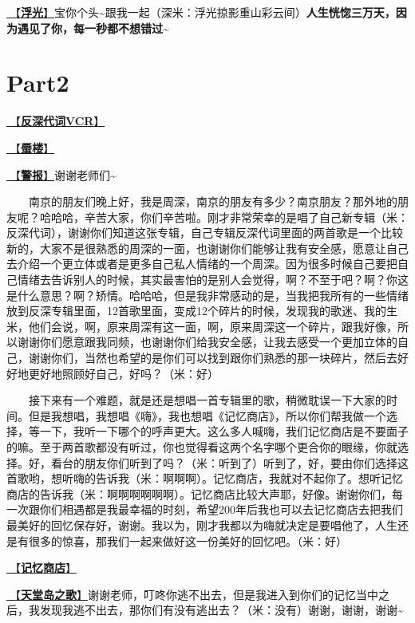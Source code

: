 \documentclass[]{ctexbook}
\begin{document}
\hyperref[floating-light]{🎵【\textbf{浮光}】}宝你个头\textasciitilde 跟我一起（深米：浮光掠影重山彩云间）\textbf{人生恍惚三万天，因为遇见了你，每一秒都不想错过\textasciitilde{}}

\section{Part2}\label{nanjing-20240811-part2}

\hyperref[senself-vcr]{🎥【\textbf{反深代词VCR}】}

\hyperref[mirage]{🎵【\textbf{蜃楼}】}

\hyperref[the-giver]{🎵【\textbf{警报}】}谢谢老师们\textasciitilde{}

  南京的朋友们晚上好，我是周深，南京的朋友有多少？南京朋友？那外地的朋友呢？哈哈哈，辛苦大家，你们辛苦啦。刚才非常荣幸的是唱了自己新专辑（米：反深代词），谢谢你们知道这张专辑，自己专辑反深代词里面的两首歌是一个比较新的，大家不是很熟悉的周深的一面，也谢谢你们能够让我有安全感，愿意让自己去介绍一个更立体或者是更多自己私人情绪的一个周深。因为很多时候自己要把自己情绪去告诉别人的时候，其实最害怕的是别人会觉得，啊？不至于吧？啊？你这是什么意思？啊？矫情。哈哈哈，但是我非常感动的是，当我把我所有的一些情绪放到反深专辑里面，12首歌里面，变成12个碎片的时候，发现我的歌迷、我的生米，他们会说，啊，原来周深有这一面，啊，原来周深这一个碎片，跟我好像，所以谢谢你们愿意跟我同频，也谢谢你们给我安全感，让我去感受一个更加立体的自己，谢谢你们，当然也希望的是你们可以找到跟你们熟悉的那一块碎片，然后去好好地更好地照顾好自己，好吗？（米：好）

  接下来有一个难题，就是还是想唱一首专辑里的歌，稍微耽误一下大家的时间。但是我想唱，我想唱《嗨》，我也想唱《记忆商店》，所以你们帮我做一个选择，等一下，我听一下哪个的呼声更大。这么多人喊嗨，我们记忆商店是不要面子的嘛。至于两首歌都没有听过，你也觉得看这两个名字哪个更合你的眼缘，你就选择。好，看台的朋友你们听到了吗？（米：听到了）听到了，好，要由你们选择这首歌哟，想听嗨的告诉我（米：啊啊啊）。记忆商店，我就对不起你了。想听记忆商店的告诉我（米：啊啊啊啊啊啊）。记忆商店比较大声耶，好像。谢谢你们，每一次跟你们相遇都是我最幸福的时刻，希望200年后我也可以去记忆商店去把我们最美好的回忆保存好，谢谢。我以为，刚才我都以为嗨就决定是要唱他了，人生还是有很多的惊喜，那我们一起来做好这一份美好的回忆吧。（米：好）

\hyperref[the-memory-store]{🎵【\textbf{记忆商店}】}

\hyperref[haven-song]{🎵【\textbf{天堂岛之歌}】}谢谢老师，叮咚你逃不出去，但是我进入到你们的记忆当中之后，我发现我逃不出去，那你们有没有逃出去？（米：没有）谢谢，谢谢，谢谢\textasciitilde{}
\end{document}
